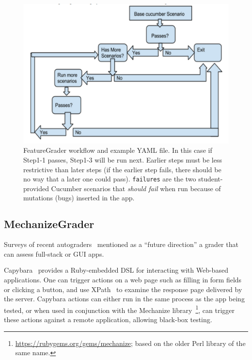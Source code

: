 \begin{figure}
  \begin{minipage}{0.45\textwidth}%
  \includegraphics[width=\textwidth]{figs/feature_grader.pdf}%
  \end{minipage}%
  \begin{minipage}{0.55\textwidth}%
  \end{minipage}
  \caption{\label{fig:featuregrader}%
FeatureGrader workflow and example YAML file.  In this case if Step1-1 passes,
Step1-3 will be run next.  Earlier steps must be less restrictive than
later steps (if the earlier step fails, there should be no way that a later one could pass).
\texttt{failures} are the two student-provided Cucumber scenarios that \emph{should fail} when
run because of mutations (bugs) inserted in the app.
}
\end{figure}

\subsection{MechanizeGrader}

Surveys of recent
autograders~\cite{ihantola-2010-autograding-survey,douce-2005-autograding-survey} mentioned as
a ``future direction'' a grader that can assess full-stack or GUI apps.


Capybara~
provides a Ruby-embedded DSL for interacting with Web-based
applications.
One can trigger actions on a web page such as filling in form fields
or clicking a button, and use XPath~\cite{xpath} to examine the
response page delivered by the server.
Capybara actions can either run in the same process as the app being
tested, or when used in conjunction with the Mechanize
library~\footnote{\url{https://rubygems.org/gems/mechanize}; based on
  the older Perl library of the same name.}, can trigger these actions
against a remote application, allowing black-box testing.



